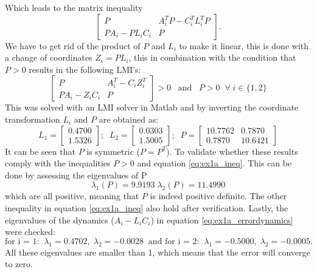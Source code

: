 Which leads to the matrix inequality
\begin{equation}
    \begin{bmatrix} P & A_i^T P - C_i^T L_i^T P \\ PA_i - PL_i C_i & P \end{bmatrix}.
    \label{eq:ex1a_ineq2}
\end{equation}
We have to get rid of the product of $P$ and $L_i$ to make it linear, this is done with a change of coordinates $Z_i = P L_i$, this in combination with the condition that $P>0$ results in the following LMI's:
\begin{equation}
\begin{bmatrix} P & A_i^T - C_i Z_i^T \\ PA_i - Z_i C_i & P \end{bmatrix} >0 \; \; \; \text{and} \; \; \; P > 0 \; \; \forall \; i \in \{1,2\}
    \label{eq:ex1a_LMIs}
\end{equation}
This was solved with an LMI solver in Matlab and by inverting the coordinate transformation $L_i$ and $P$ are obtained as:
\begin{equation}
    L_1 = \begin{bmatrix} 0.4700 \\ 1.5326 \end{bmatrix}; \; \; 
    L_2 = \begin{bmatrix} 0.0303 \\ 1.5005 \end{bmatrix}; \; \;
    P = \begin{bmatrix} 10.7762 & 0.7870 \\ 0.7870 & 10.6421 \end{bmatrix} 
    \label{eq:ex1a_results}
\end{equation}
It can be seen that $P$ is symmetric ($P = P^T$). To validate whether these results comply with the inequalities $P>0$ and equation \eqref{eq:ex1a_ineq}. This can be done by assessing the eigenvalues of P
\begin{equation}
    \lambda_1(P) = 9.9193 \; \lambda_2(P) = 11.4990 
\end{equation}
which are all positive, meaning that $P$ is indeed positive definite. The other inequality in equation \eqref{eq:ex1a_ineq} also hold after verification. Lastly, the eigenvalues of the dynamics ($A_i - L_i C_i$) in equation \eqref{eq:ex1a_errordynamics} were checked:
\begin{equation}
    \text{for i = 1:}\; \;  \lambda_1 = 0.4702, \; \lambda_2 = -0.0028 \; \; \text{and for i = 2:}\; \; \lambda_1 = -0.5000, \; \lambda_2 = -0.0005.
\end{equation}
All these eigenvalues are smaller than 1, which means that the error will converge to zero.

